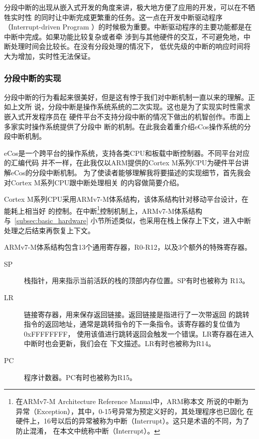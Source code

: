 分段中断的出现从嵌入式开发的角度来讲，极大地方便了应用的开发，可以在不牺牲实时性
的同时让中断完成更繁重的任务。这一点在开发中断驱动程序（Interrupt-driven Program
）的时候极为重要。中断驱动程序的主要功能都是在中断中完成。如果功能比较复杂或者牵
涉到与其他硬件的交互，不可避免地，中断处理时间会比较长。在没有分段处理的情况下，
低优先级的中断的响应时间将大为增加，实时性无法保证。

\subsubsection{分段中断的实现}
\label{subsubsec:segment_software}

分段中断的行为看起来很美好，但是这有悖于我们对中断机制一直以来的理解。正如上文所
说，分段中断是操作系统系统的二次实现。这也是为了实现实时性需求嵌入式开发程序员在
硬件平台不支持分段中断的情况下做出的机智创作。市面上多家实时操作系统提供了分段中
断的机制。在此我会着重介绍eCos操作系统的分段中断机制。

eCos是一个跨平台的操作系统，支持各类CPU和板载中断控制器。不同平台对应的汇编代码
并不一样，在此我仅以ARM提供的Cortex M系列CPU为硬件平台讲解eCos的分段中断机制。
为了使读者能够理解我将要描述的实现细节，首先我会对Cortex M系列CPU跟中断处理相关
的内容做简要介绍。

Cortex M系列CPU采用ARMv7-M体系结构，该体系结构针对移动平台设计，在能耗上相当好
的控制。在中断\footnote{在ARMv7-M Architecture Reference Manual中，ARM称本文
所说的中断为异常（Exception），其中，0-15号异常为预定义好的，其处理程序也已固化
在硬件上，16号以后的异常被称为中断（Interrupt）。这只是术语的不同，为了防止混淆，
在本文中统称中断（Interrupt）。}控制机制上，ARMv7-M体系结构与~\ref{subsec:basic_hardware}
小节所述类似，也采用在栈上保存上下文，进入中断处理之后结束再恢复上下文。

ARMv7-M体系结构包含13个通用寄存器，R0-R12，以及3个额外的特殊寄存器。

\begin{description}
	\item[SP] 栈指针，用来指示当前活跃的栈的顶部内存位置。SP有时也被称为
	R13。
	\item[LR] 链接寄存器，用来保存返回链接。返回链接是指进行了一次带返回
	的跳转指令的返回地址，通常是跳转指令的下一条指令。该寄存器的复位值为0xFFFFFFFF，
	使用该值进行跳转返回会触发一个错误。LR寄存器在进入中断时也会更新，我们会在
	下文描述。LR有时也被称为R14。
	\item[PC] 程序计数器。PC有时也被称为R15。
\end{description}

